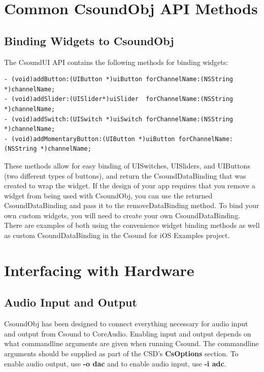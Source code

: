 \documentclass[11pt]{article}
\begin{document}

\section{Common CsoundObj API Methods}

\subsection{Binding Widgets to CsoundObj}

The CsoundUI API contains the following methods for binding widgets:

\begin{lstlisting}[caption=Methods for Widget Binding]
- (void)addButton:(UIButton *)uiButton forChannelName:(NSString *)channelName;
- (void)addSlider:(UISlider*)uiSlider  forChannelName:(NSString *)channelName;
- (void)addSwitch:(UISwitch *)uiSwitch forChannelName:(NSString *)channelName;
- (void)addMomentaryButton:(UIButton *)uiButton forChannelName:(NSString *)channelName;
\end{lstlisting}

These methods allow for easy binding of UISwitches, UISliders, and UIButtons (two different types of buttons), and return the CsoundDataBinding that was created to wrap the widget. If the design of your app requires that you remove a widget from being used with CsoundObj, you can use the returned CsoundDataBinding and pass it to the removeDataBinding method. To bind your own custom widgets, you will need to create your own CsoundDataBinding.  There are examples of both using the convenience widget binding methods as well as custom CsoundDataBinding in the Csound for iOS Examples project.


\section{Interfacing with Hardware}
\subsection{Audio Input and Output}

CsoundObj has been designed to connect everything necessary for audio input and output from Csound to CoreAudio.  Enabling input and output depends on what commandline arguments are given when running Csound.  The commandline arguments should be supplied as part of the CSD's \textbf{CsOptions} section.  To enable audio output, use \textbf{-o dac} and to enable audio input, use \textbf{-i adc}.
\end{document}
